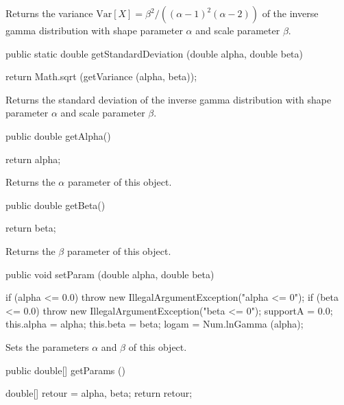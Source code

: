 \begin{tabb}
   Returns the variance $\mbox{Var}[X] = \beta^2 / ((\alpha - 1)^2(\alpha - 2))$
   of the inverse gamma  distribution with shape parameter $\alpha$ and scale
parameter $\beta$.
\end{tabb}
\begin{code}

   public static double getStandardDeviation (double alpha, double beta)\begin{hide} {
      return Math.sqrt (getVariance (alpha, beta));
   }\end{hide}
\end{code}
\begin{tabb}
   Returns the standard deviation of the inverse gamma  distribution with
   shape parameter $\alpha$ and scale parameter $\beta$.
\end{tabb}
\begin{code}

   public double getAlpha()\begin{hide} {
      return alpha;
   }\end{hide}
\end{code}
\begin{tabb}
   Returns the $\alpha$ parameter of this object.
\end{tabb}
\begin{code}

   public double getBeta()\begin{hide} {
      return beta;
   }\end{hide}
\end{code}
\begin{tabb}
   Returns the $\beta$ parameter of this object.
\end{tabb}
\begin{code}

   public void setParam (double alpha, double beta)\begin{hide} {
      if (alpha <= 0.0)
         throw new IllegalArgumentException("alpha <= 0");
      if (beta <= 0.0)
         throw new IllegalArgumentException("beta <= 0");
      supportA = 0.0;
      this.alpha = alpha;
      this.beta = beta;
      logam = Num.lnGamma (alpha);
   }\end{hide}
\end{code}
\begin{tabb}
   Sets the parameters $\alpha$ and $\beta$ of this object.
\end{tabb}
\begin{code}

   public double[] getParams ()\begin{hide} {
      double[] retour = {alpha, beta};
      return retour;
   }\end{hide}
\end{code}
